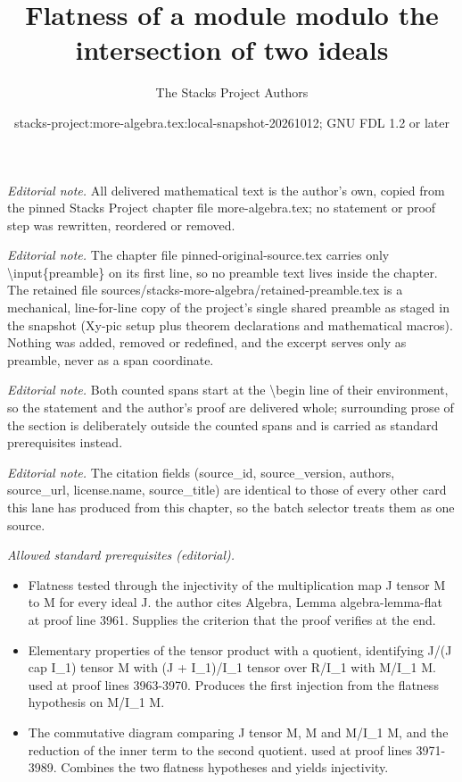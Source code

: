 \documentclass[10pt,a4paper]{amsart}
\title{Flatness of a module modulo the intersection of two ideals}
\author{The Stacks Project Authors}
\date{stacks-project:more-algebra.tex:local-snapshot-20261012; GNU FDL 1.2 or later}
\theoremstyle{plain}
\theoremstyle{definition}
\theoremstyle{remark}
\numberwithin{equation}{subsection}
\begin{document}
\maketitle
\setcounter{subsection}{1}
\noindent\textit{Editorial note.} All delivered mathematical text is the author's own, copied from the pinned Stacks Project chapter file more-algebra.tex; no statement or proof step was rewritten, reordered or removed.\par\medskip
\noindent\textit{Editorial note.} The chapter file pinned-original-source.tex carries only \textbackslash{}input\{preamble\} on its first line, so no preamble text lives inside the chapter. The retained file sources/stacks-more-algebra/retained-preamble.tex is a mechanical, line-for-line copy of the project's single shared preamble as staged in the snapshot (Xy-pic setup plus theorem declarations and mathematical macros). Nothing was added, removed or redefined, and the excerpt serves only as preamble, never as a span coordinate.\par\medskip
\noindent\textit{Editorial note.} Both counted spans start at the \textbackslash{}begin line of their environment, so the statement and the author's proof are delivered whole; surrounding prose of the section is deliberately outside the counted spans and is carried as standard prerequisites instead.\par\medskip
\noindent\textit{Editorial note.} The citation fields (source\_id, source\_version, authors, source\_url, license.name, source\_title) are identical to those of every other card this lane has produced from this chapter, so the batch selector treats them as one source.\par\medskip
\noindent\textit{Allowed standard prerequisites (editorial).}\begin{itemize}
\item Flatness tested through the injectivity of the multiplication map J tensor M to M for every ideal J. the author cites Algebra, Lemma algebra-lemma-flat at proof line 3961. Supplies the criterion that the proof verifies at the end.
\item Elementary properties of the tensor product with a quotient, identifying J/(J cap I\_1) tensor M with (J + I\_1)/I\_1 tensor over R/I\_1 with M/I\_1 M. used at proof lines 3963-3970. Produces the first injection from the flatness hypothesis on M/I\_1 M.
\item The commutative diagram comparing J tensor M, M and M/I\_1 M, and the reduction of the inner term to the second quotient. used at proof lines 3971-3989. Combines the two flatness hypotheses and yields injectivity.
\end{itemize}\medskip
\end{document}
